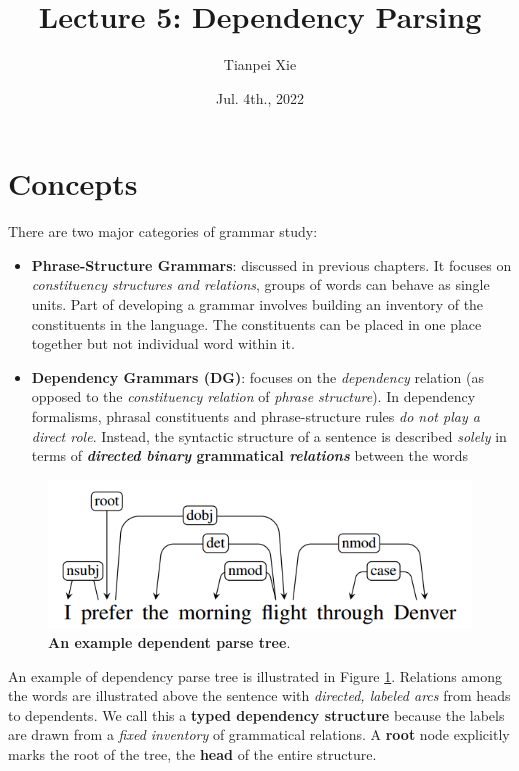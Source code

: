 \documentclass[11pt]{article}
\begin{document}
\title{Lecture 5: Dependency Parsing}
\author{ Tianpei Xie}
\date{ Jul. 4th., 2022 }
\maketitle
\tableofcontents
\newpage
\allowdisplaybreaks
\section{Concepts}
There are two major categories of grammar study:
\begin{itemize}
\item \textbf{Phrase-Structure Grammars}: discussed in previous chapters. It focuses on \emph{constituency structures and relations}, groups of words can behave as single units.  Part of developing a grammar involves building an inventory of the constituents in the language. The constituents can be placed in one place together but not individual word within it.

\item \textbf{Dependency Grammars (DG)}: focuses on the \emph{dependency} relation (as opposed to the \emph{constituency relation} of \emph{phrase structure}). In dependency formalisms, phrasal constituents and phrase-structure rules \emph{do not play a direct role}. Instead, the syntactic structure of a sentence is described \emph{solely} in terms of \textbf{\emph{directed binary} grammatical \emph{relations}} between the words
\end{itemize}

\begin{figure}
\begin{minipage}[t]{1\linewidth}
  \centering
  \centerline{\includegraphics[scale = 0.5]{dependent_parse_tree.png}}
\end{minipage}
\caption{\footnotesize{\textbf{An example dependent parse tree}.}}
\label{fig: dep_parse_tree}
\end{figure}

An example of dependency parse tree is illustrated in Figure \ref{fig: dep_parse_tree}. Relations among the words are illustrated above the sentence with \emph{directed, labeled arcs} from heads to dependents. We call this a \textbf{typed dependency structure} because the labels are drawn from a \emph{fixed inventory} of grammatical relations. A \textbf{root} node explicitly marks the root of the tree, the \textbf{head} of the entire structure.
\end{document}
